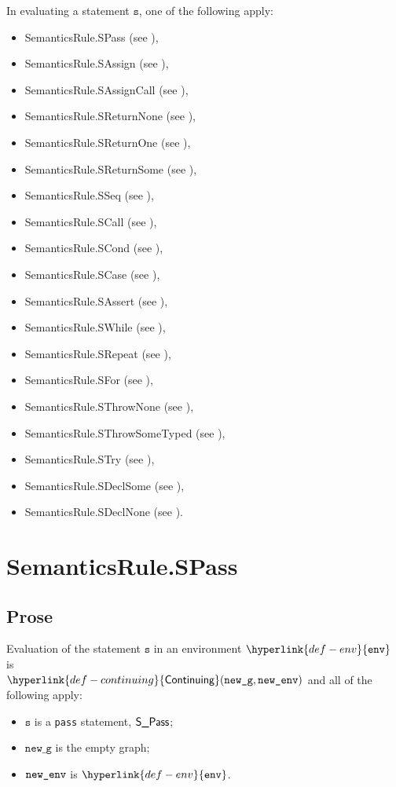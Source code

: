 \documentclass{book}
\newcommand\Continuing[0]{\hyperlink{def-continuing}{\textsf{Continuing}}}
\newcommand\env[0]{\hyperlink{def-env}{\texttt{env}}}
\newcommand\newg[0]{\texttt{new\_g}}
\newcommand\vs[0]{\texttt{s}}
\begin{document}
In evaluating a statement $\vs$, one of the following apply:
\begin{itemize}
\item SemanticsRule.SPass (see ),
\item SemanticsRule.SAssign (see ),
\item SemanticsRule.SAssignCall (see ),
\item SemanticsRule.SReturnNone (see ),
\item SemanticsRule.SReturnOne (see ),
\item SemanticsRule.SReturnSome (see ),
\item SemanticsRule.SSeq (see ),
\item SemanticsRule.SCall (see ),
\item SemanticsRule.SCond (see ),
\item SemanticsRule.SCase (see ),
\item SemanticsRule.SAssert (see ),
\item SemanticsRule.SWhile (see ),
\item SemanticsRule.SRepeat (see ),
\item SemanticsRule.SFor (see ),
\item SemanticsRule.SThrowNone (see ),
\item SemanticsRule.SThrowSomeTyped (see ),
\item SemanticsRule.STry (see ),
\item SemanticsRule.SDeclSome (see ),
\item SemanticsRule.SDeclNone (see ).
\end{itemize}

\section{SemanticsRule.SPass \label{sec:SemanticsRule.SPass}}
  \subsection{Prose}
  Evaluation of the statement $\vs$ in an environment $\env$ is \\
  $\Continuing(\newg, \newenv)$ and all of the following apply:
  \begin{itemize}
  \item $\vs$ is a \texttt{pass} statement, $\textsf{S\_Pass}$;
  \item $\newg$ is the empty graph;
  \item $\texttt{new\_env}$ is $\env$.
  \end{itemize}
\end{document}
